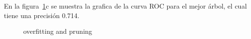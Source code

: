 En la figura~\ref{fig:over}c se muestra la grafica de la curva ROC para el mejor árbol, el cual
tiene una precisión 0.714.


\begin{figure}
  \centering
  \caption{overfitting and pruning}
  \label{fig:over}
\end{figure}

